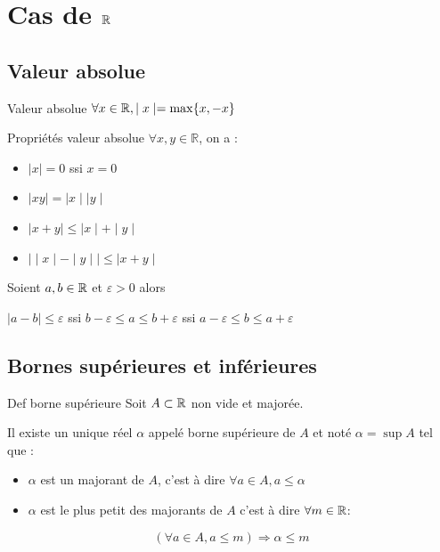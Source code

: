 \section{Cas de \texorpdfstring{$\mathbb{R}$}{R}}
\subsection{Valeur absolue}

\begin{definition}{Valeur absolue}{}
    $\forall x \in \mathbb{R}, \mid x \mid = \max\{x, -x\}$
\end{definition}

\begin{proposition}{Propriétés valeur absolue}{}
    $\forall x, y \in \mathbb R$, on a : 

    \begin{itemize}
        \item $\mid x \mid = 0$ ssi $x = 0$
        \item $ \mid xy \mid = \mid x \mid \mid y \mid$
        \item $\mid x + y \mid \leqslant \mid x \mid + \mid y \mid$
        \item $ \mid \mid x \mid - \mid y \mid \mid \leqslant \mid x + y \mid$
    \end{itemize}
\end{proposition}


\begin{exemple}
    Soient $a, b \in \mathbb{R}$ et $\varepsilon > 0$ alors 

    $\mid a - b \mid \leqslant \varepsilon$ ssi $b - \varepsilon \leqslant a \leqslant b + \varepsilon$
    ssi $a - \varepsilon \leqslant b \leqslant a + \varepsilon$
\end{exemple}

\subsection{Bornes supérieures et inférieures}

\begin{theoreme}{Def borne supérieure}{}
    Soit $A \subset \mathbb{R}$ non vide et majorée. 

    Il existe un unique réel $\alpha$ appelé borne supérieure de $A$ et noté 
    $\alpha = \sup A$ tel que : 
    \begin{itemize}
        \item $\alpha$ est un majorant de $A$, c'est à dire $\forall a \in A, a \leqslant \alpha$
        \item $\alpha$ est le plus petit des majorants de $A$ c'est à dire $\forall m \in \mathbb{R}$: 
    \end{itemize}

    $$ (\forall a \in A, a \leqslant m ) \Rightarrow \alpha \leqslant m$$
\end{theoreme}

